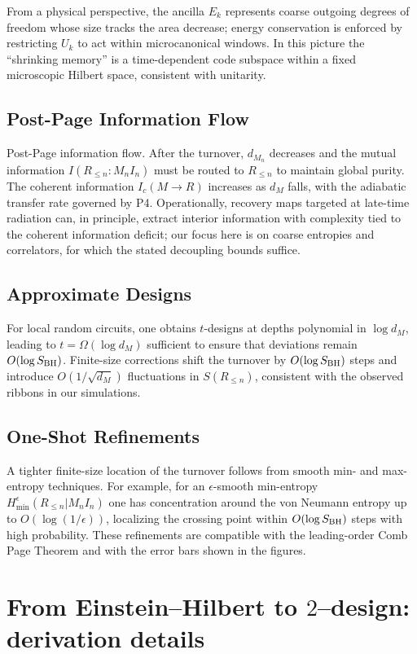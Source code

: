 \documentclass[11pt,a4paper]{article}
\providecommand{\texorpdfstring}[2]{#1}
\theoremstyle{plain}
\theoremstyle{definition}
\theoremstyle{remark}
\begin{document}
From a physical perspective, the ancilla $E_k$ represents coarse outgoing degrees of freedom whose size tracks the area decrease; energy conservation is enforced by restricting $U_k$ to act within microcanonical windows. In this picture the ``shrinking memory'' is a time-dependent code subspace within a fixed microscopic Hilbert space, consistent with unitarity.

\subsection{Post-Page Information Flow}
Post-Page information flow. After the turnover, $d_{M_n}$ decreases and the mutual information $I(R_{\le n}:M_n I_n)$ must be routed to $R_{\le n}$ to maintain global purity. The coherent information $I_c(M\to R)$ increases as $d_M$ falls, with the adiabatic transfer rate governed by P4. Operationally, recovery maps targeted at late-time radiation can, in principle, extract interior information with complexity tied to the coherent information deficit; our focus here is on coarse entropies and correlators, for which the stated decoupling bounds suffice.

\subsection{Approximate Designs}
For local random circuits, one obtains $t$-designs at depths polynomial in $\log d_M$, leading to $t=\Omega(\log d_M)$ sufficient to ensure that deviations remain $O(\log S_{\rm BH})$. Finite-size corrections shift the turnover by $O(\log S_{\rm BH})$ steps and introduce $O(1/\sqrt{d_M})$ fluctuations in $S(R_{\le n})$, consistent with the observed ribbons in our simulations.

\subsection{One-Shot Refinements}
A tighter finite-size location of the turnover follows from smooth min- and max-entropy techniques. For example, for an $\epsilon$-smooth min-entropy $H_{\min}^{\epsilon}(R_{\le n}|M_n I_n)$ one has concentration around the von Neumann entropy up to $O(\log(1/\epsilon))$, localizing the crossing point within $O(\log S_{\rm BH})$ steps with high probability. These refinements are compatible with the leading-order Comb Page Theorem and with the error bars shown in the figures.

\section{From Einstein--Hilbert to \texorpdfstring{$2$}{2}--design: derivation details}
\label{app:EH-2design}
\end{document}
